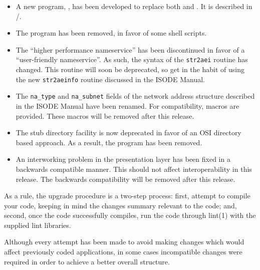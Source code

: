 \begin{itemize}
\item	A new program, , has been developed to replace both
	 and .
	It is described in \volfour/.

\item	The  program has been removed,
	in favor of some shell scripts.

\item	The ``higher performance nameservice'' has been discontinued in favor
	of a ``user-friendly nameservice''.
	As such,
	the syntax of the \verb"str2aei" routine has changed.
	This routine will soon be deprecated,
	so get in the habit of using the new \verb"str2aeinfo" routine
	discussed in the ISODE Manual.

\item	The \verb"na_type" and \verb"na_subnet" fields of the network address
	structure described in the ISODE Manual
	have been renamed.
	For compatibility,
	macros are provided.
	These macros will be removed after this release.

\item	The stub directory facility is now deprecated in favor of an OSI
	directory based approach.
	As a result,
	the  program has been removed.

\item	An interworking problem in the presentation layer has been
	fixed in a backwards compatible manner.  This should not
	affect interoperability in this release.
	The backwards compatibility will be removed after this release.

\end{itemize}

As a rule,
the upgrade procedure is a two-step process:
first,
attempt to compile your code, keeping in mind the changes summary relevant to
the code;
and,
second,
once the code successfully compiles,
run the code through \man lint(1) with the supplied lint libraries.

Although
every attempt has been made to avoid making changes which would affect
previously coded applications,
in some cases incompatible changes were required in order to
achieve a better overall structure.
